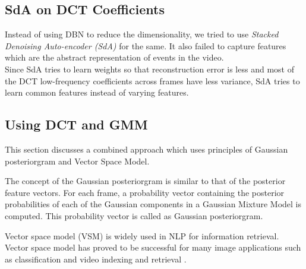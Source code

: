 \subsection{SdA on DCT Coefficients}
Instead of using DBN to reduce the dimensionality, we tried to use \textit{Stacked Denoising Auto-encoder (SdA)} for the same.  It also failed to capture features which are the abstract representation of events in the video.\\
Since SdA tries to learn weights so that reconstruction error is less and most of the DCT low-frequency coefficients across frames have less variance, SdA tries to learn common features instead of varying features.\\

\subsection{Using DCT and GMM}
\label{sec:event:dct_gmm}
This section discusses a combined approach which uses principles of Gaussian posteriorgram and Vector Space Model.

The concept of the Gaussian posteriorgram is similar to that of the posterior feature vectors\citep{zhang2010towards}.  For each frame, a probability vector containing the posterior probabilities of each of the Gaussian components in a Gaussian Mixture Model is computed.  This probability vector is called as  Gaussian posteriorgram.

Vector space model (VSM) is widely used in NLP for information retrieval.  Vector space model has proved to be successful for many image applications such as classification and video indexing and retrieval \citep{galmar2007analysis}.

